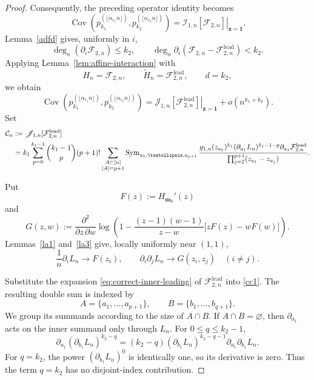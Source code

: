 \documentclass[11pt]{amsart}
\theoremstyle{plain}
\numberwithin{equation}{section}
\numberwithin{theorem}{section}
\numberwithin{figure}{section}
\begin{document}
\begin{proof}
Consequently, the preceding operator identity becomes
\begin{equation}
\operatorname{Cov}\left(
    p_{k_1}^{(\lfloor\alpha_{r_1}n\rfloor)},
    p_{k_2}^{(\lfloor\alpha_{r_2}n\rfloor)}
\right)
=
\left.
\mathscr I_{1,n}[\mathcal F_{2,n}]
\right|_{\mathbf z=\mathbf1}.
\label{eq:covariance-as-interaction}
\end{equation}
Lemma~\ref{adfd} gives, uniformly in \(i\),
\[
    \deg_n(\partial_i\mathcal F_{2,n})\leq k_2,
    \qquad
    \deg_n\partial_i\left(
        \mathcal F_{2,n}-\mathcal F^{\mathrm{lead}}_{2,n}
    \right)<k_2.
\]
Applying Lemma~\ref{lem:affine-interaction} with
\[
    H_n=\mathcal F_{2,n},
    \qquad
    \widetilde H_n=\mathcal F^{\mathrm{lead}}_{2,n},
    \qquad d=k_2,
\]
we obtain
\begin{equation}
\operatorname{Cov}\left(
    p_{k_1}^{(\lfloor\alpha_{r_1}n\rfloor)},
    p_{k_2}^{(\lfloor\alpha_{r_2}n\rfloor)}
\right)
=
\left.
\mathscr J_{1,n}[\mathcal F^{\mathrm{lead}}_{2,n}]
\right|_{\mathbf z=\mathbf1}
+o(n^{k_1+k_2}).
\label{eq:covariance-leading-interaction}
\end{equation}
Set
\begin{align}
\mathcal C_n
&:=\mathscr J_{1,n}[\mathcal F^{\mathrm{lead}}_{2,n}]
\notag\\
&=k_1\sum_{p=0}^{k_1-1}
\binom{k_1-1}{p}(p+1)!
\sum_{\substack{A\subset[n]\\ |A|=p+1}}
\operatorname{Sym}_{a_1,\ldots,a_{p+1}}
\frac{
    g_{1,n}(z_{a_1})^{k_1}
    (\partial_{a_1}L_n)^{k_1-1-p}
    \partial_{a_1}\mathcal F^{\mathrm{lead}}_{2,n}
}{
    \prod_{j=2}^{p+1}(z_{a_1}-z_{a_j})
}.
\label{cc1}
\end{align}

Put
\[
    F(z):=H_{\mathbf m_0}'(z)
\]
and
\begin{equation}
    G(z,w)
    :=
    \frac{\partial^2}{\partial z\,\partial w}
    \log\left(
        1-
        \frac{(z-1)(w-1)}{z-w}
        \bigl[zF(z)-wF(w)\bigr]
    \right).
    \label{eq:covariance-mixed-kernel}
\end{equation}
Lemmas~\ref{la1} and~\ref{la3} give, locally uniformly near
$(1,1)$,
\[
    \frac1n\partial_iL_n\longrightarrow F(z_i),
    \qquad
    \partial_i\partial_jL_n\longrightarrow G(z_i,z_j)
    \quad(i\ne j).
\]

Substitute the expansion
\eqref{eq:correct-inner-leading} of
\(\mathcal F^{\mathrm{lead}}_{2,n}\) into \eqref{cc1}.
The resulting double sum is indexed by
\[
    A=\{a_1,\ldots,a_{p+1}\},
    \qquad
    B=\{b_1,\ldots,b_{q+1}\}.
\]
We group its summands according to the size of \(A\cap B\).
If $A\cap B=\varnothing$, then $\partial_{a_1}$ acts on the inner
summand only through $L_n$.  For $0\le q\le k_2-1$,
\begin{equation}
    \partial_{a_1}(\partial_{b_1}L_n)^{k_2-q}
    =
    (k_2-q)(\partial_{b_1}L_n)^{k_2-q-1}
    \partial_{a_1}\partial_{b_1}L_n.
    \label{eq:correct-chain-rule}
\end{equation}
For $q=k_2$, the power $(\partial_{b_1}L_n)^0$ is identically one,
so its derivative is zero.  Thus the term $q=k_2$ has no
disjoint-index contribution. 


\end{proof}
\end{document}
